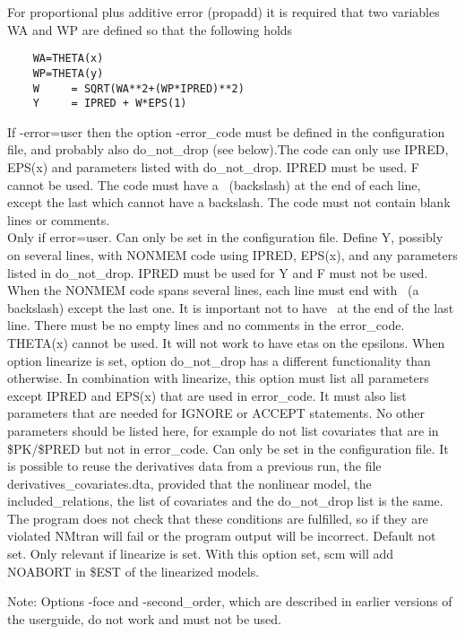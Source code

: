 \begin{optionlist}
For proportional plus additive error (propadd) it is required that two variables WA and WP are defined so that the following holds 
\begin{verbatim}
    WA=THETA(x)
    WP=THETA(y)
    W     = SQRT(WA**2+(WP*IPRED)**2)
    Y     = IPRED + W*EPS(1)
\end{verbatim}
If -error=user then the option -error\_code must be defined in the configuration file, and probably also do\_not\_drop (see below).The code can only use IPRED, EPS(x) and parameters listed with do\_not\_drop. IPRED must be used. F cannot be used. The code must have a \ (backslash) at the end of each line, except the last which cannot have a backslash. The code must not contain blank lines or comments.  \\
\nextopt
{}
Only if error=user. Can only be set in the configuration file. Define Y, possibly on several lines, with NONMEM code using IPRED, EPS(x), and any parameters listed in do\_not\_drop. IPRED must be used for Y and F must not be used. When the NONMEM code spans several lines, each line must end with \ (a backslash) except the last one. It is important not to have \ at the end of the last line. There must be no empty lines and no comments in the error\_code. THETA(x) cannot be used. It will not work to have etas on the epsilons. 
\nextopt
{}
When option linearize is set, option do\_not\_drop has a different functionality than otherwise. 
In combination with linearize, this option must list all parameters except IPRED and EPS(x) that are used in 
error\_code. It must also list parameters that are needed for IGNORE or ACCEPT statements. No other parameters 
should be listed here, for example do not list covariates that are in \$PK/\$PRED but not in error\_code. 
\nextopt
{}
Can only be set in the configuration file. It is possible to reuse the derivatives data from a previous run, the file derivatives\_covariates.dta, provided that the nonlinear model, the included\_relations, the list of covariates and the do\_not\_drop list is the same. The program does not check that these conditions are fulfilled, so if they are violated NMtran will fail or the program output will be incorrect. 
\nextopt
{}
Default not set. Only relevant if linearize is set. With this option set, scm will add NOABORT in \$EST of the linearized models. 
\nextopt
\end{optionlist}

Note: Options -foce and -second\_order, which are described in earlier versions
of the userguide, do not work and must not be used.

